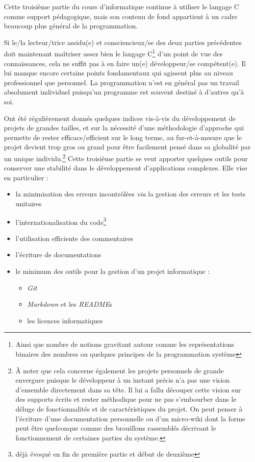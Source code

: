 \documentclass[../../main.tex]{subfiles}
\begin{document}
Cette troisième partie du cours d'informatique continue à utiliser le langage C comme support pédagogique, mais son contenu de fond appartient à un cadre beaucoup plus général de la programmation.
 
Si le/la lecteur/trice assidu(e) et consciencieux/se des deux parties précédentes doit maintenant maîtriser assez bien le langage C\footnote{Ainsi que nombre de notions gravitant autour comme les représentations binaires des nombres ou quelques principes de la programmation système} d'un point de vue des connaissances, cela ne suffit pas à en faire un(e) développeur/se compétent(e). Il lui manque encore certains points fondamentaux qui agissent plus au niveau professionnel que personnel. La programmation n'est en général pas un travail absolument individuel puisqu'un programme est souvent destiné à d'autres qu'à soi.

Ont été régulièrement donnés quelques indices vis-à-vis du développement de projets de grandes tailles, et sur la nécessité d'une méthodologie d'approche qui permette de rester efficace/efficient sur le long terme, au fur-et-à-mesure que le projet devient trop gros ou grand pour être facilement pensé dans sa globalité par un unique individu.\footnote{À noter que cela concerne également les projets personnels de grande envergure puisque le développeur à un instant précis n'a pas une vision d'ensemble directement dans sa tête. Il lui a fallu découper cette vision sur des supports écrits et rester méthodique pour ne pas s'embourber dans le déluge de fonctionnalités et de caractéristiques du projet. On peut penser à l'écriture d'une documentation personnelle ou d'un micro-wiki dont la forme peut être quelconque comme des brouillons rassemblés décrivant le fonctionnement de certaines parties du système.} Cette troisième partie se veut apporter quelques outils pour conserver une stabilité dans le développement d'applications complexes. Elle vise en particulier :
\begin{itemize}
	\item la minimisation des erreurs incontrôlées \textit{via} la gestion des erreurs et les tests unitaires
	\item l'internationalisation du code\footnote{déjà évoqué en fin de première partie et début de deuxième}
	\item l'utilisation efficiente des commentaires
	\item l'écriture de documentations
	\item le minimum des outils pour la gestion d'un projet informatique :
		\begin{itemize}
			\item \textit{Git}
			\item \textit{Markdown} et les \textit{README}s
			\item les licences informatiques
		\end{itemize}
\end{itemize}
\hrulefill
\newpage
\end{document}
